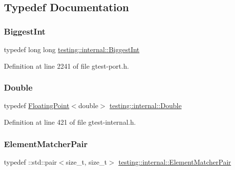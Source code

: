 \subsection{Typedef Documentation}
\mbox{\label{namespacetesting_1_1internal_a05c6bd9ede5ccdf25191a590d610dcc6}} 
\subsubsection{\texorpdfstring{Biggest\+Int}{BiggestInt}}
{\footnotesize\ttfamily typedef long long \hyperlink{namespacetesting_1_1internal_a05c6bd9ede5ccdf25191a590d610dcc6}{testing\+::internal\+::\+Biggest\+Int}}



Definition at line 2241 of file gtest-\/port.\+h.

\mbox{\label{namespacetesting_1_1internal_a66a7579b1893b260c31dad577f7a5c48}} 
\subsubsection{\texorpdfstring{Double}{Double}}
{\footnotesize\ttfamily typedef \hyperlink{classtesting_1_1internal_1_1FloatingPoint}{Floating\+Point}$<$double$>$ \hyperlink{namespacetesting_1_1internal_a66a7579b1893b260c31dad577f7a5c48}{testing\+::internal\+::\+Double}}



Definition at line 421 of file gtest-\/internal.\+h.

\mbox{\label{namespacetesting_1_1internal_a109863545f08651178bf0f520aebd33b}} 
\subsubsection{\texorpdfstring{Element\+Matcher\+Pair}{ElementMatcherPair}}
{\footnotesize\ttfamily typedef \+::std\+::pair$<$size\+\_\+t, size\+\_\+t$>$ \hyperlink{namespacetesting_1_1internal_a109863545f08651178bf0f520aebd33b}{testing\+::internal\+::\+Element\+Matcher\+Pair}}




